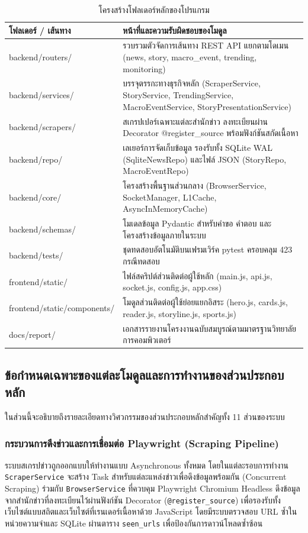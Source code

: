 \begin{table}[H]
\centering
\caption{โครงสร้างโฟลเดอร์หลักของโปรแกรม}
\label{tab_folder_structure}
\begin{tabularx}{\textwidth}{|L{4.2cm}|Y|}
\hline
\textbf{โฟลเดอร์ / เส้นทาง} & \textbf{หน้าที่และความรับผิดชอบของโมดูล} \\
\hline
backend/routers/ & รวบรวมตัวจัดการเส้นทาง REST API แยกตามโดเมน (news, story, macro\_event, trending, monitoring) \\ \hline
backend/services/ & บรรจุตรรกะทางธุรกิจหลัก (ScraperService, StoryService, TrendingService, MacroEventService, StoryPresentationService) \\ \hline
backend/scrapers/ & สเกรปเปอร์เฉพาะแต่ละสำนักข่าว ลงทะเบียนผ่าน Decorator @register\_source พร้อมฟังก์ชันสกัดเนื้อหา \\ \hline
backend/repo/ & เลเยอร์การจัดเก็บข้อมูล รองรับทั้ง SQLite WAL (SqliteNewsRepo) และไฟล์ JSON (StoryRepo, MacroEventRepo) \\ \hline
backend/core/ & โครงสร้างพื้นฐานส่วนกลาง (BrowserService, SocketManager, L1Cache, AsyncInMemoryCache) \\ \hline
backend/schemas/ & โมเดลข้อมูล Pydantic สำหรับคำขอ คำตอบ และโครงสร้างข้อมูลภายในระบบ \\ \hline
backend/tests/ & ชุดทดสอบอัตโนมัติบนเฟรมเวิร์ค pytest ครอบคลุม 423 กรณีทดสอบ \\ \hline
frontend/static/ & ไฟล์สคริปต์ส่วนติดต่อผู้ใช้หลัก (main.js, api.js, socket.js, config.js, app.css) \\ \hline
frontend/static/components/ & โมดูลส่วนติดต่อผู้ใช้ย่อยแยกอิสระ (hero.js, cards.js, reader.js, storyline.js, sports.js) \\ \hline
docs/report/ & เอกสารรายงานโครงงานฉบับสมบูรณ์ตามมาตรฐานวิทยาลัยการคอมพิวเตอร์ \\
\hline
\end{tabularx}
\end{table}

\subsection{ข้อกำหนดเฉพาะของแต่ละโมดูลและการทำงานของส่วนประกอบหลัก}

ในส่วนนี้จะอธิบายถึงรายละเอียดทางวิศวกรรมของส่วนประกอบหลักสำคัญทั้ง 11 ส่วนของระบบ

\subsubsection{กระบวนการดึงข่าวและการเชื่อมต่อ Playwright (Scraping Pipeline)}
ระบบสเกรปข่าวถูกออกแบบให้ทำงานแบบ Asynchronous ทั้งหมด โดยในแต่ละรอบการทำงาน \texttt{ScraperService} จะสร้าง Task สำหรับแต่ละแหล่งข่าวเพื่อดึงข้อมูลพร้อมกัน (Concurrent Scraping) ร่วมกับ \texttt{BrowserService} ที่ควบคุม Playwright Chromium Headless ดึงข้อมูลจากสำนักข่าวที่ลงทะเบียนไว้ผ่านฟังก์ชัน Decorator (\texttt{@register\_source}) เพื่อรองรับทั้งเว็บไซต์แบบสถิตและเว็บไซต์ที่เรนเดอร์เนื้อหาด้วย JavaScript โดยมีระบบตรวจสอบ URL ซ้ำในหน่วยความจำและ SQLite ผ่านตาราง \texttt{seen\_urls} เพื่อป้องกันการดาวน์โหลดซ้ำซ้อน

